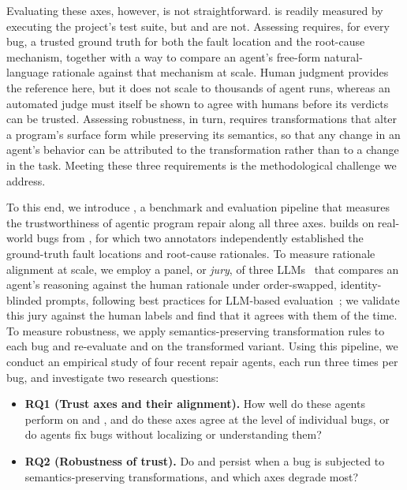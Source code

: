 Evaluating these axes, however, is not straightforward. \accuracy{} is readily measured by
executing the project's test suite, but \interpretability{} and \robustness{} are not.
Assessing \interpretability{} requires, for every bug, a trusted ground truth for both the
fault location and the root-cause mechanism, together with a way to compare an agent's
free-form natural-language rationale against that mechanism at scale. Human judgment
provides the reference here, but it does not scale to thousands of agent runs, whereas an
automated judge must itself be shown to agree with humans before its verdicts can be
trusted. Assessing robustness, in turn, requires transformations that alter a program's
surface form while preserving its semantics, so that any change in an agent's behavior can
be attributed to the transformation rather than to a change in the task. Meeting these
three requirements is the methodological challenge we address.

To this end, we introduce \trustRepair{}, a benchmark and evaluation pipeline that
measures the trustworthiness of agentic program repair along all three axes.
\trustRepair{} builds on \numBugs{} real-world bugs from \sweBenchVerified{}, for which two annotators independently established the ground-truth fault
locations and root-cause rationales. To measure rationale alignment at scale, we employ a
panel, or \emph{jury}, of three LLMs~\cite{verga2024poll} that compares an agent's reasoning
against the human rationale under order-swapped, identity-blinded prompts, following best
practices for LLM-based evaluation~\cite{zheng2023judging}; we validate this jury against
the human labels and find that it agrees with them \juryAgreement{} of the time. To measure
robustness, we apply \numTransforms{} semantics-preserving transformation rules to each bug and
re-evaluate \accuracy{} and \interpretability{} on the transformed variant. Using this pipeline,
we conduct an empirical study of four recent repair agents, each run three times
per bug, and investigate two research questions:

\begin{itemize}
  \item \textbf{RQ1 (Trust axes and their alignment).} How well do these
  agents perform on \accuracy{} and \interpretability{}, and do these axes agree at the level of
  individual bugs, or do agents fix bugs without localizing or understanding them?
  \item \textbf{RQ2 (Robustness of trust).} Do \accuracy{} and \interpretability{} persist when a
  bug is subjected to semantics-preserving transformations, and which axes degrade most?
\end{itemize}

